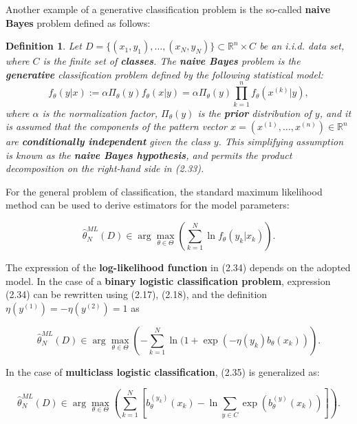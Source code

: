 \documentclass{report}
\newtheorem{definition}{Definition}[chapter]
\begin{document}
Another example of a generative classification problem is the so-called \textbf{naive Bayes} problem defined as follows:

\begin{definition}
Let $D = \{(x_1,y_1),\dots,(x_N,y_N)\} \subset \mathbb{R}^n \times C$ be an i.i.d. data set, where $C$ is the finite set of \textbf{classes}. The \textbf{naive Bayes} problem is the \textbf{generative} classification problem defined by the following statistical model:
\begin{equation}
f_\theta(y|x) := \alpha \Pi_\theta(y) f_\theta(x|y) = \alpha \Pi_\theta(y) \prod_{k=1}^n f_\theta(x^{(k)}|y),
\end{equation}
where $\alpha$ is the normalization factor, $\Pi_\theta(y)$ is the \textbf{prior} distribution of $y$, and it is assumed that the components of the pattern vector $x = (x^{(1)},\dots,x^{(n)}) \in \mathbb{R}^n$ are \textbf{conditionally independent} given the class $y$. This simplifying assumption is known as the \textbf{naive Bayes hypothesis}, and permits the product decomposition on the right-hand side in (2.33).
\end{definition}

For the general problem of classification, the standard maximum likelihood method can be used to derive estimators for the model parameters:

\begin{equation}
\hat{\theta}^{ML}_N(D) \in \arg \max_{\theta \in \Theta} \left(\sum_{k=1}^N \ln f_\theta(y_k|x_k)\right).
\end{equation}

The expression of the \textbf{log-likelihood function} in (2.34) depends on the adopted model. In the case of a \textbf{binary logistic classification problem}, expression (2.34) can be rewritten using (2.17), (2.18), and the definition $\eta(y^{(1)}) = -\eta(y^{(2)}) = 1$ as

\begin{equation}
\hat{\theta}^{ML}_N(D) \in \arg \max_{\theta \in \Theta} \left(-\sum_{k=1}^N \ln(1+\exp(-\eta(y_k)b_\theta(x_k))\right).
\end{equation}

In the case of \textbf{multiclass logistic classification}, (2.35) is generalized as:

\begin{equation}
\hat{\theta}^{ML}_N(D) \in \arg \max_{\theta \in \Theta} \left(
\sum_{k=1}^N\left[b_\theta^{(y_k)}(x_k) - \ln \sum_{y \in C} \exp(b_\theta^{(y)}(x_k))\right]\right).
\end{equation}
\end{document}
